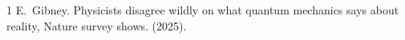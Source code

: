\documentclass[12pt]{article}
\theoremstyle{definition}
\theoremstyle{plain}
\begin{document}

\begin{thebibliography}{1}
E.~Gibney.
\newblock Physicists disagree wildly on what quantum mechanics says about
  reality, {Nature} survey shows.
 (2025).
\end{thebibliography}
\end{document}
